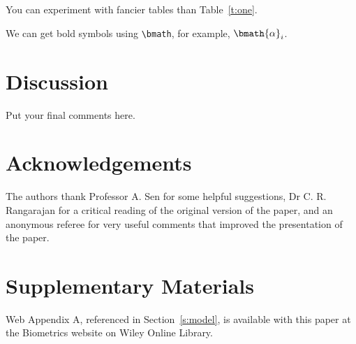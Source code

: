 \documentclass[useAMS,referee]{biom}
\begin{document}
You can experiment with fancier tables than Table~\ref{t:one}.

We can get bold symbols using \verb+\bmath+, for example, $\bmath{\alpha}_i$.

\section{Discussion}
\label{s:discuss}

Put your final comments here. 


\backmatter


\section*{Acknowledgements}

The authors thank Professor A. Sen for some helpful suggestions,
Dr C. R. Rangarajan for a critical reading of the original version of the
paper, and an anonymous referee for very useful comments that improved
the presentation of the paper.\vspace*{-8pt}


\section*{Supplementary Materials}

Web Appendix A, referenced in Section~\ref{s:model}, is available with
this paper at the Biometrics website on Wiley Online
Library.\vspace*{-8pt}

\end{document}
